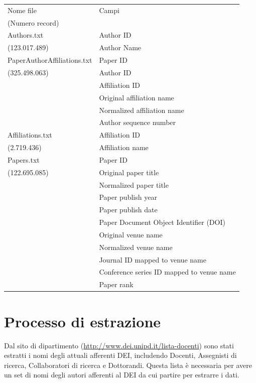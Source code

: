 \documentclass[12pt,a4paper,twoside]{report}
\begin{document}
\begin{center}
\label{table:msrstruttura1}
\begin{longtable}{| l | l |}
\hline
Nome file&
Campi\\
(Numero record)&\\
\hline
Authors.txt&Author ID\\
(123.017.489)&Author Name\\
\hline
PaperAuthorAffiliations.txt&Paper ID\\
(325.498.063)&Author ID\\
&Affiliation ID\\
&Original affiliation name\\
&Normalized affiliation name\\
&Author sequence number\\
\hline
Affiliations.txt&Affiliation ID\\
(2.719.436)&Affiliation name\\
\hline
Papers.txt&Paper ID\\
(122.695.085)&Original paper title\\
&Normalized paper title\\
&Paper publish year\\
&Paper publish date\\
&Paper Document Object Identifier (DOI)\\
&Original venue name\\
&Normalized venue name\\
&Journal ID mapped to venue name\\
&Conference series ID mapped to venue name\\
&Paper rank\\
\hline
\end{longtable}
\end{center}
\FloatBarrier

\section{Processo di estrazione} \label{sec:processo}

Dal sito di dipartimento (\url{http://www.dei.unipd.it/lista-docenti}) sono stati estratti i nomi
degli attuali afferenti DEI, includendo Docenti, Assegnisti di ricerca, Collaboratori di ricerca e
Dottorandi. Questa lista è necessaria per avere un set di nomi degli autori afferenti al DEI da cui
partire per estrarre i dati.
\end{document}
